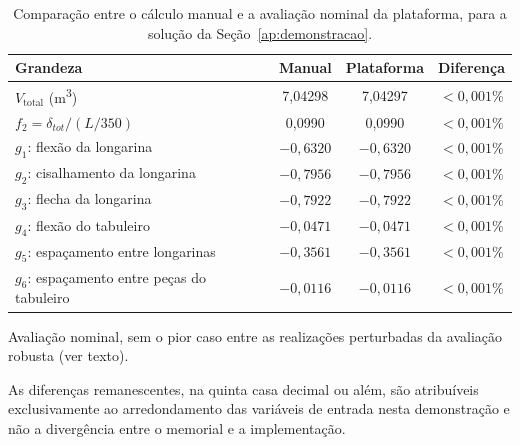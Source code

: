 \begin{appendices}
\begin{table}[!ht]
\caption{Comparação entre o cálculo manual e a avaliação nominal da plataforma, para a solução da Seção~\ref{ap:demonstracao}.\label{tab:ap_sintese}}
\begin{threeparttable}
\footnotesize
\setlength{\tabcolsep}{3pt}
\begin{tabular*}{\columnwidth}{@{\extracolsep\fill}lccc@{\extracolsep\fill}}
\toprule
Grandeza & Manual & Plataforma\tnote{a} & Diferença \\
\midrule
$V_{\mathrm{total}}$ (m\textsuperscript{3}) & 7{,}04298 & 7{,}04297 & $< 0{,}001\%$ \\
$f_2 = \delta_{tot}/(L/350)$ & 0{,}0990 & 0{,}0990 & $< 0{,}001\%$ \\
$g_1$: flexão da longarina & $-0{,}6320$ & $-0{,}6320$ & $< 0{,}001\%$ \\
$g_2$: cisalhamento da longarina & $-0{,}7956$ & $-0{,}7956$ & $< 0{,}001\%$ \\
$g_3$: flecha da longarina & $-0{,}7922$ & $-0{,}7922$ & $< 0{,}001\%$ \\
$g_4$: flexão do tabuleiro & $-0{,}0471$ & $-0{,}0471$ & $< 0{,}001\%$ \\
$g_5$: espaçamento entre longarinas & $-0{,}3561$ & $-0{,}3561$ & $< 0{,}001\%$ \\
$g_6$: espaçamento entre peças do tabuleiro & $-0{,}0116$ & $-0{,}0116$ & $< 0{,}001\%$ \\
\bottomrule
\end{tabular*}
\begin{tablenotes}
\footnotesize
\item[a] Avaliação nominal, sem o pior caso entre as realizações perturbadas da avaliação robusta (ver texto).
\item As diferenças remanescentes, na quinta casa decimal ou além, são atribuíveis exclusivamente ao arredondamento das variáveis de entrada nesta demonstração e não a divergência entre o memorial e a implementação.
\end{tablenotes}
\end{threeparttable}
\end{table}


\end{appendices}

